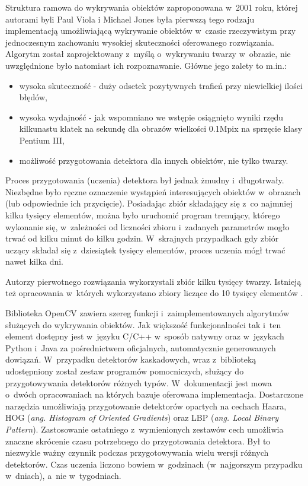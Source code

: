 Struktura ramowa do wykrywania obiektów zaproponowana w~2001 roku, której
autorami byli Paul Viola i Michael Jones \cite{DBLP:conf/cvpr/ViolaJ01}
była pierwszą tego
rodzaju implementacją umożliwiającą wykrywanie obiektów w~czasie
rzeczywistym przy jednoczesnym zachowaniu wysokiej skuteczności
oferowanego rozwiązania. Algorytm został zaprojektowany z~myślą o~wykrywaniu
twarzy w~obrazie, nie uwzględnione było natomiast ich rozpoznawanie.
Główne jego zalety to m.in.:

\begin{itemize}
\item wysoka skuteczność - duży odsetek pozytywnych trafień przy niewielkiej
ilości błędów,
\item wysoka wydajność - jak wspomniano we wstępie osiągnięto wyniki
rzędu kilkunastu klatek na sekundę dla obrazów wielkości 0.1Mpix na sprzęcie
klasy Pentium III,
\item możliwość przygotowania detektora dla innych obiektów, nie tylko
twarzy.
\end{itemize}

Proces przygotowania (uczenia) detektora był jednak żmudny i~długotrwały.
Niezbędne było ręczne oznaczenie wystąpień interesujących obiektów
w~obrazach (lub odpowiednie ich przycięcie). 
Posiadając zbiór składający się z~co najmniej kilku tysięcy elementów,
można było uruchomić program trenujący, którego wykonanie się, w~zależności
od liczności zbioru i~zadanych parametrów mogło trwać od kilku minut do 
kilku godzin. W~skrajnych przypadkach gdy zbiór uczący składał
się z~dziesiątek tysięcy elementów, proces uczenia mógł trwać nawet
kilka dni.

Autorzy pierwotnego rozwiązania wykorzystali zbiór kilku tysięcy
twarzy. Istnieją też opracowania w~których wykorzystano zbiory
liczące do 10 tysięcy elementów \cite{WEB:ocvnaotoshiseo}.

Biblioteka OpenCV zawiera szereg funkcji i~zaimplementowanych algorytmów służących 
do wykrywania obiektów. Jak większość funkcjonalności tak i~ten
element dostępny jest w~języku C/C++ w~sposób natywny oraz 
w~językach Python i~Java za pośrednictwem oficjalnych, automatycznie
generowanych dowiązań. W~przypadku detektorów kaskadowych,
wraz z~biblioteką udostępniony został zestaw
programów pomocniczych, służący do przygotowywania
detektorów różnych typów. W~dokumentacji
\cite{OCV:cascadeclassification}
jest mowa o~dwóch opracowaniach \cite{DBLP:conf/cvpr/ViolaJ01,
DBLP:conf/icip/LienhartM02} na których bazuje oferowana
implementacja. Dostarczone narzędzia umożliwiają przygotowanie
detektorów opartych na cechach Haara, HOG 
(\textit{ang. Histogram of Oriented Gradients}) oraz LBP 
(\textit{ang. Local Binary
Pattern}). Zastosowanie ostatniego z~wymienionych zestawów cech umożliwia
znaczne skrócenie czasu potrzebnego do przygotowania detektora.
Był to niezwykle ważny czynnik podczas przygotowywania
wielu wersji różnych detektorów. Czas uczenia liczono bowiem
w~godzinach (w~najgorszym przypadku w~dniach), a~nie w~tygodniach.

